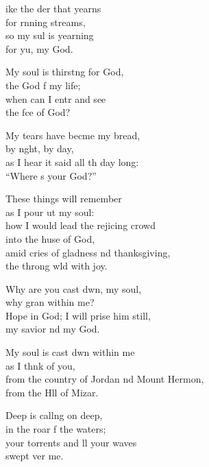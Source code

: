 \settowidth{\versewidth}{From the country of Jordan and Mount Hermon}
\begin{psalmverse}[\versewidth]
  \begin{patverse}
ike the der that yearns\Med\\
for rnning streams,\\
so my sul is yearning\Med\\
for yu, my God.

My soul is thirst\pointup{\i}ng for God,\Med\\
the God f my life;\\
when can I entr and see\Med\\
the fce of God?

My tears have becme my bread,\Med\\
by n\pointup{\i}ght, by day,\\
as I hear it said all th day long:\Med\\
“Where \pointup{\i}s your God?”

These things will  remember\Med\\
as I pour ut my soul:\\
how I would lead the rejicing crowd\Med\\
into the huse of God,\\
amid cries of gladness nd thanksgiving,\Med\\
the throng w\pointup{\i}ld with joy.

Why are you cast dwn, my soul,\Med\\
why gran within me?\\
Hope in God; I will prise him still,\Med\\
my savior nd my God.

My soul is cast dwn within me\Med\\
as I th\pointup{\i}nk of you,\\
from the country of Jordan nd Mount Hermon,\Med\\
from the H\pointup{\i}ll of Mizar.

Deep is call\pointup{\i}ng on deep,\Med\\
in the roar f the waters;\\
your torrents and ll your waves\Med\\
swept ver me.


\end{patverse}
\end{psalmverse}
